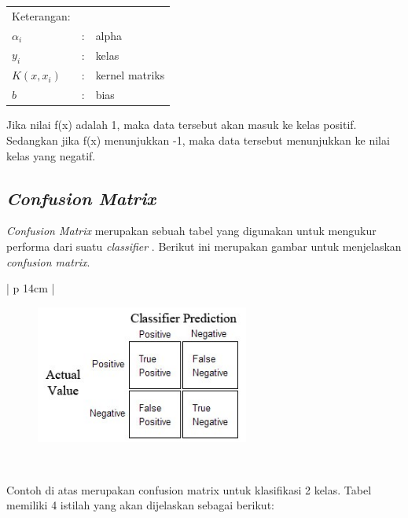 \noindent
\renewcommand{\arraystretch}{1}
\begin{tabularx}{\textwidth}{lll}
	\hline
	Keterangan: \\
	$\alpha_{i}$ & : & alpha\\
	$y_{i}$ & : & kelas\\
	$K(x,x_{i})$ & : & kernel matriks\\
	$b$ & : & bias\\
	\hline
\end{tabularx}
\vspace{4.5pt}

Jika nilai f(x) adalah 1, maka data tersebut akan masuk ke kelas positif. Sedangkan jika f(x) menunjukkan -1, maka data tersebut menunjukkan ke nilai kelas yang negatif.
\\


\subsection{\textit{Confusion Matrix}}
\textit{Confusion Matrix} merupakan sebuah tabel yang digunakan untuk mengukur performa dari suatu \textit{classifier} \cite{confusion-matrix}. Berikut ini merupakan gambar untuk menjelaskan \textit{confusion matrix}.
\begin{table}[H]
	\small
	\begin{adjustbox}{width=1\textwidth}
		\begin{tabular}{| p {14cm} |}
			\hline
			\begin{figure}[H]
				\centering
				\includegraphics[width=7cm]{images/confusion_matrix.jpg}
			\end{figure} \\
			\hline
		\end{tabular}
	\end{adjustbox}
	\label{img:confusionmatrix}
\end{table}
Contoh di atas merupakan confusion matrix untuk klasifikasi 2 kelas. Tabel memiliki 4 istilah yang akan dijelaskan sebagai berikut:

